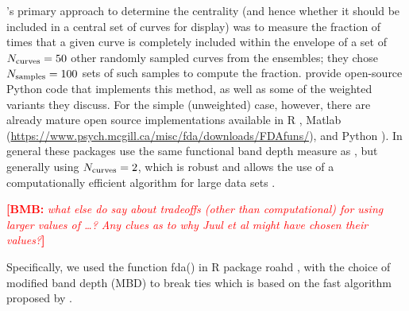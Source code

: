 \documentclass[12pt]{article}
\newcommand{\comment}{\showcomment}
\newcommand{\showcomment}[3]{\textcolor{#1}{\textbf{[#2: }\textsl{#3}\textbf{]}}}
\newcommand{\pkg}[1]{\textsf{#1}}  %
\newcommand{\bmb}[1]{\comment{red}{BMB}{#1}}
\theoremstyle{definition} %
\begin{document}
\cite{juul2021fixed}'s primary approach to determine the centrality (and hence whether it should be included in a central set of curves for display) was to measure the fraction of times that a given curve is completely included within the envelope of a set of $N_{\textrm{curves}}=50$ other randomly sampled curves from the ensembles; they chose $N_{\textrm{samples}}=100$ sets of such samples to compute the fraction. \cite{juul2021fixed} provide open-source Python code that implements this method, as well as some of the weighted variants they discuss. For the simple (unweighted) case, however, there are already mature open source implementations available in R \citep{fda_pkg,roahd}, Matlab (\url{https://www.psych.mcgill.ca/misc/fda/downloads/FDAfuns/}), and Python \citep{seabold2010statsmodels}). In general these packages use the same functional band depth measure as \cite{juul2021fixed}, but generally using $N_{\textrm{curves}}=2$, which is robust and allows the use of a computationally efficient algorithm for large data sets \citep{sun2012exact}.

\bmb{what else do \cite{sun2012exact} say about tradeoffs (other than computational) for using larger values of \ncurve \ldots ? Any clues as to why Juul et al might have chosen their values?}



Specifically, we used the function fda() in R \citep{R} package \pkg{roahd} \citep{roahd}, with the choice of modified band depth (MBD) to break ties which is based on the fast algorithm proposed by \cite{sun2012exact}. 
\end{document}
